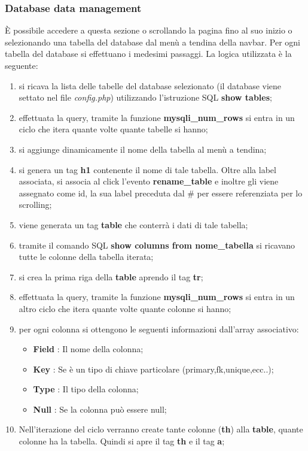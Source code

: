 \subsubsection{Database data management}
È possibile accedere a questa sezione o scrollando la pagina fino al suo inizio o selezionando una tabella del database dal menù a tendina della navbar.
Per ogni tabella del database si effettuano i medesimi passaggi.
La logica utilizzata è la seguente:
\begin{enumerate}
\item si ricava la lista delle tabelle del database selezionato (il database viene settato nel file \textit{config.php}) utilizzando l'istruzione SQL \textbf{show tables};
\item effettuata la query, tramite la funzione \textbf{mysqli\_num\_rows} si entra in un ciclo che itera quante volte quante tabelle si hanno;
\item si aggiunge dinamicamente il nome della tabella al menù a tendina;
\item si genera un tag \textbf{h1} contenente il nome di tale tabella. Oltre alla label associata, si associa al click l'evento \textbf{rename\_table} e inoltre gli viene assegnato come id, la sua label preceduta dal \# per essere referenziata per lo scrolling; 
\item viene generata un tag \textbf{table} che conterrà i dati di tale tabella; 
\item tramite il comando SQL \textbf{show columns from nome\_tabella} si ricavano tutte le colonne della tabella iterata;
\item si crea la prima riga della \textbf{table} aprendo il tag \textbf{tr};
\item effettuata la query, tramite la funzione \textbf{mysqli\_num\_rows} si entra in un altro ciclo che itera quante volte quante colonne si hanno;
\item per ogni colonna si ottengono le seguenti informazioni dall'array associativo:
\begin{itemize}
\item \textbf{Field} : Il nome della colonna;
\item \textbf{Key} : Se è un tipo di chiave particolare (primary,fk,unique,ecc..);
\item \textbf{Type} : Il tipo della colonna;
\item \textbf{Null} : Se la colonna può essere null;
\end{itemize}
\item Nell'iterazione del ciclo verranno create tante colonne (\textbf{th}) alla \textbf{table}, quante colonne ha la tabella. Quindi si apre il tag \textbf{th} e il tag \textbf{a};

\end{enumerate}
